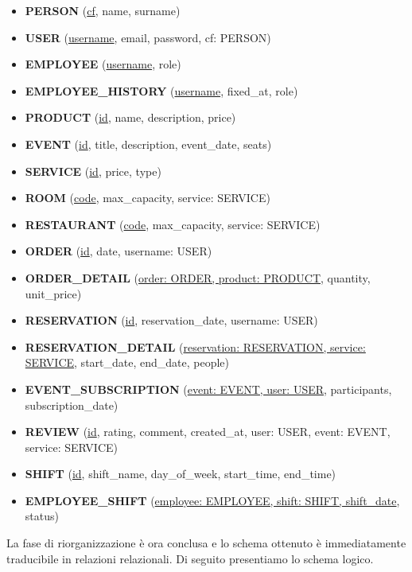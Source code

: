 \documentclass[a4paper,12pt]{report}
\begin{document}
\begin{itemize}
    \item \textbf{PERSON} (\underline{cf}, name, surname)
    \item \textbf{USER} (\underline{username}, email, password, cf: PERSON)
    \item \textbf{EMPLOYEE} (\underline{username}, role)
    \item \textbf{EMPLOYEE\_HISTORY} (\underline{username}, fixed\_at, role)
    \item \textbf{PRODUCT} (\underline{id}, name, description, price)
    \item \textbf{EVENT} (\underline{id}, title, description, event\_date, seats)
    \item \textbf{SERVICE} (\underline{id}, price, type)
    \item \textbf{ROOM} (\underline{code}, max\_capacity, service: SERVICE)
    \item \textbf{RESTAURANT} (\underline{code}, max\_capacity, service: SERVICE)
    \item \textbf{ORDER} (\underline{id}, date, username: USER)
    \item \textbf{ORDER\_DETAIL} (\underline{order: ORDER, product: PRODUCT}, quantity, unit\_price)
    \item \textbf{RESERVATION} (\underline{id}, reservation\_date, username: USER)
    \item \textbf{RESERVATION\_DETAIL} (\underline{reservation: RESERVATION, service: SERVICE}, start\_date, end\_date, people)
    \item \textbf{EVENT\_SUBSCRIPTION} (\underline{event: EVENT, user: USER}, participants, subscription\_date)
    \item \textbf{REVIEW} (\underline{id}, rating, comment, created\_at, user: USER, event: EVENT, service: SERVICE)
    \item \textbf{SHIFT} (\underline{id}, shift\_name, day\_of\_week, start\_time, end\_time)
    \item \textbf{EMPLOYEE\_SHIFT} (\underline{employee: EMPLOYEE, shift: SHIFT, shift\_date}, status)
\end{itemize}

La fase di riorganizzazione è ora conclusa e lo schema ottenuto è
immediatamente traducibile in relazioni relazionali. Di seguito
presentiamo lo schema logico.
\end{document}
